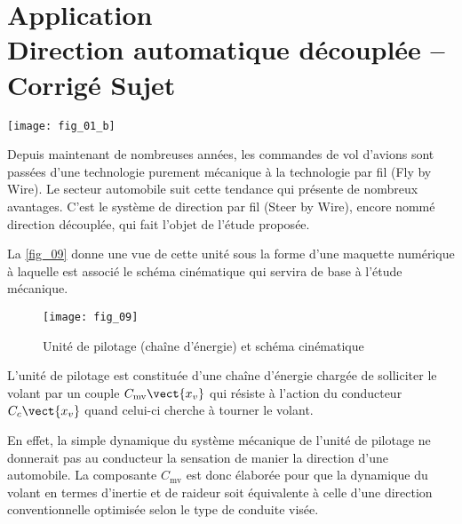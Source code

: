 \chapter*{Application  \\ 
Direction automatique découplée -- \ifprof Corrigé \else Sujet \fi}


\iflivret {} \else
\ifprof  {} \else \fi
\fi
\setcounter{question}{0}

\begin{marginfigure}
\texttt{[image: fig\_01\_b]}
\end{marginfigure}


\ifprof
\else
Depuis maintenant de nombreuses années, les commandes de vol d'avions sont passées d'une
technologie purement mécanique à la technologie par fil (Fly by Wire). Le secteur automobile suit cette
tendance qui présente de nombreux avantages. C'est le système de direction par fil (Steer by Wire), encore nommé direction découplée, qui fait l'objet de l'étude proposée.


La \autoref{fig_09} donne une vue de cette unité sous la forme d'une maquette numérique à laquelle est
associé le schéma cinématique qui servira de base à l'étude mécanique.

\begin{figure}[H]
\centering
\texttt{[image: fig\_09]}

\caption{Unité de pilotage (chaîne d'énergie) et schéma cinématique  \label{fig_09}}
\end{figure}

L'unité de pilotage est constituée d'une chaîne d'énergie chargée de solliciter le volant par un
couple $C_{\text{mv}} \vect{x_v}$ qui résiste à l'action du conducteur $C_{c} \vect{x_v}$
quand celui-ci cherche à tourner le volant.

En effet, la simple dynamique du système mécanique de l'unité de pilotage ne donnerait pas au
conducteur la sensation de manier la direction d'une automobile. La composante $C_{\text{mv}}$ est donc élaborée pour que la dynamique du volant en termes d'inertie et de raideur soit équivalente à celle d'une direction conventionnelle optimisée selon le type de conduite visée.

